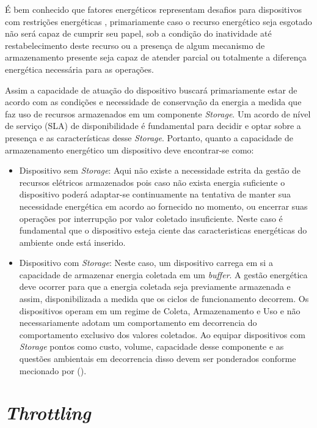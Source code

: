 É bem conhecido que fatores energéticos representam desafios para dispositivos com restrições energéticas \cite{kansal_power_2007}, primariamente caso o recurso energético seja esgotado não será capaz de cumprir seu papel, sob a condição do inatividade até restabelecimento deste recurso ou a presença de algum mecanismo de armazenamento presente seja capaz de atender parcial ou totalmente a diferença energética necessária para as operações.  

Assim a capacidade de atuação do dispositivo buscará primariamente estar de acordo com as condições e necessidade de conservação da energia a medida que faz uso de recursos armazenados em um componente \textit{Storage}. Um acordo de nível de serviço (\acl{SLA}) de disponibilidade é fundamental para decidir e optar sobre a presença e as características desse \textit{Storage}. Portanto, quanto a capacidade de armazenamento energético um dispositivo deve encontrar-se como: 

\begin{itemize}
    \item Dispositivo sem \textit{Storage}: Aqui não existe a necessidade estrita da gestão de recursos elétricos armazenados pois caso não exista energia suficiente o dispositivo poderá adaptar-se continuamente na tentativa de manter sua necessidade energética em acordo ao fornecido no momento, ou encerrar suas operações por interrupção por valor coletado insuficiente. Neste caso é fundamental que o dispositivo esteja ciente das caracteristicas energéticas do ambiente onde está inserido.
    
    \item Dispositivo com \textit{Storage}: Neste caso, um dispositivo carrega em si a capacidade de armazenar energia coletada em um \textit{buffer}. A gestão energética deve ocorrer para que a energia coletada seja previamente armazenada e assim, disponibilizada a medida que os ciclos de funcionamento decorrem. Os dispositivos operam em um regime de Coleta, Armazenamento e Uso e não necessariamente adotam um comportamento em decorrencia do comportamento exclusivo dos valores coletados. Ao equipar dispositivos com \textit{Storage} pontos como custo, volume, capacidade desse componente e as questões ambientais em decorrencia disso devem ser ponderados conforme mecionado por \citeauthor{merrett_energy-driven_2017}(\citeyear{merrett_energy-driven_2017}).

\end{itemize}

\section{\textit{Throttling}}

